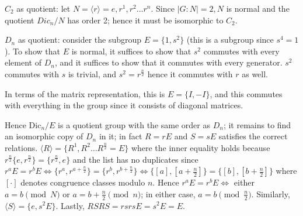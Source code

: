 \documentclass{article}
\def\<{\langle}
\def\>{\rangle}
\def\Dic{\textrm{Dic}}
\begin{document}
$C_2$ as quotient: let $N = \<r\> = e, r^1, r^2 \ldots r^n$. Since $|G:N|=2, N$ is normal and the quotient $Dic_n / N$ has order 2; hence it must be isomorphic to $C_2$.

$D_n$ as quotient: consider the subgroup $E = \{1, s^2\}$ (this is a subgroup since $s^4 = 1$). To show that $E$ is normal, it suffices to show that $s^2$ commutes with every element of $D_n$, and it suffices to show that it commutes with every generator. $s^2$ commutes with $s$ is trivial, and $s^2 = r^\frac{n}{2}$ hence it commutes with $r$ as well.

In terms of the matrix representation, this is $E = \{I, -I\}$, and this commutes with everything in the group since it consists of diagonal matrices.

Hence $\Dic_n / E$ is a quotient group with the same order as $D_n$; it remains to find an isomorphic copy of $D_n$ in it; in fact $R = rE$ and $S = sE$ satisfies the correct relations. $\<R\> = \{ R^1, R^2 \ldots R^\frac{n}{2} = E\}$ where the inner equality holds because $r^\frac{n}{2} \{e, r^\frac{n}{2}\} = \{r^\frac{n}{2}, e\}$ and the list has no duplicates since $r^a E = r^b E \iff \{r^a, r^{a + \frac{n}{2}}\} = \{r^b, r^{b + \frac{n}{2}}\} \iff \{[a], [a+\frac{n}{2}]\} = \{[b], [b+\frac{n}{2}]\}$ where $[\cdot]$ denotes congruence classes modulo $n$. Hence $r^a E = r^b E \iff$ either $a = b \pmod N$ or $a = b + \frac{n}{2} \pmod n$; in either case, $a = b \pmod{\frac{n}{2}}$. Similarly, $\<S\> = \{e, s^2 E\}$. Lastly, $RSRS = rsrs E = s^2E = E$.




\end{document}
